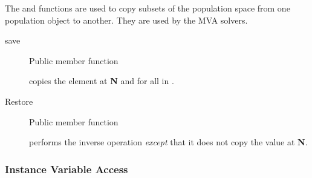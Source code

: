 The  and  functions are used to copy
subsets of the population space from one population object to another.
They are used by the  MVA solvers.
\begin{description}

\item[save] \texonly{---} Public member function\\

   copies the element at {\bf N} and 
  for all  in .

\item[Restore] \texonly{---} Public member function\\

   performs the inverse operation \emph{except} that it
  does not copy the value at {\bf N}.

\end{description}

\subsubsection{Instance Variable Access}

